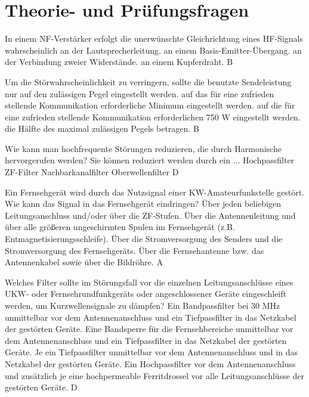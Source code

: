 
\section*{Theorie- und Prüfungsfragen} 

{In einem NF-Verstärker erfolgt die unerwünschte Gleichrichtung eines HF-Signals wahrscheinlich}%
{an der Lautsprecherleitung.}%
{an einem Basis-Emitter-Übergang.}%
{an der Verbindung zweier Widerstände.}%
{an einem Kupferdraht.}%
{B}%

{Um die Störwahrscheinlichkeit zu verringern, sollte die benutzte Sendeleistung}%
{nur auf den zulässigen Pegel eingestellt werden.}%
{auf das für eine zufrieden stellende Kommunikation erforderliche Minimum eingestellt werden.}%
{auf die für eine zufrieden stellende Kommunikation erforderlichen 750 W eingestellt werden.}%
{die Hälfte des maximal zulässigen Pegels betragen.}%
{B}%

{Wie kann man hochfrequente Störungen reduzieren, die durch Harmonische hervorgerufen werden? Sie können reduziert werden durch ein ...}%
{Hochpassfilter}%
{ZF-Filter}%
{Nachbarkanalfilter}%
{Oberwellenfilter}%
{D}%

{Ein Fernsehgerät wird durch das Nutzsignal einer KW-Amateurfunkstelle gestört. Wie kann das Signal in das Fernsehgerät eindringen?}%
{Über jeden beliebigen Leitungsanschluss
und/oder über die ZF-Stufen.}%
{Über die Antennenleitung und über alle größeren ungeschirmten Spulen im Fernsehgerät (z.B. Entmagnetisierungsschleife).}%
{Über die Stromversorgung des Senders und die Stromversorgung des Fernsehgeräts.}%
{Über die Fernsehantenne bzw. das Antennenkabel sowie über die Bildröhre.}%
{A}%

{Welches Filter sollte im Störungsfall vor die einzelnen Leitungsanschlüsse eines UKW- oder Fernsehrundfunkgeräts oder angeschlossener Geräte eingeschleift werden, um Kurzwellensignale zu dämpfen?}%
{Ein Bandpassfilter bei 30 MHz unmittelbar vor dem Antennenanschluss und ein Tiefpassfilter in das Netzkabel der gestörten Geräte.}%
{Eine Bandsperre für die Fernsehbereiche unmittelbar vor dem Antennenanschluss und ein Tiefpassfilter in das Netzkabel der gestörten Geräte.}%
{Je ein Tiefpassfilter unmittelbar vor dem Antennenanschluss und in das Netzkabel der gestörten Geräte.}%
{Ein Hochpassfilter vor dem Antennenanschluss und zusätzlich je eine hochpermeable Ferritdrossel vor alle Leitungsanschlüsse der gestörten Geräte.}%
{D}%

